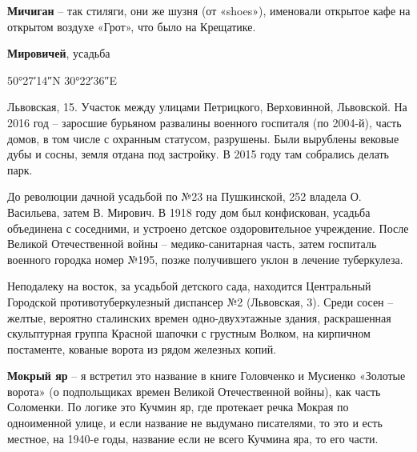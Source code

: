 

\textbf{Мичиган} – так стиляги, они же шузня (от «shoes»), именовали открытое кафе на открытом воздухе «Грот», что было на Крещатике.\\

\medskip

\textbf{Мировичей}, усадьба

50°27′14″N 30°22′36″E

Львовская, 15. Участок между улицами Петрицкого, Верховинной, Львовской. На 2016 год – заросшие бурьяном развалины военного госпиталя (по 2004-й), часть домов, в том числе с охранным статусом, разрушены. Были вырублены вековые дубы и сосны, земля отдана под застройку. В 2015 году там собрались делать парк.

До революции дачной усадьбой по №23 на Пушкинской, 252 владела О. Васильева, затем В. Мирович. В 1918 году дом был конфискован, усадьба объединена с соседними, и устроено детское оздоровительное учреждение. После Великой Отечественной войны – медико-санитарная часть, затем госпиталь военного городка номер №195, позже получившего уклон в лечение туберкулеза.

Неподалеку на восток, за усадьбой детского сада, находится Центральный Городской противотуберкулезный диспансер №2 (Львовская, 3). Среди сосен – желтые, вероятно сталинских времен одно-двухэтажные здания, раскрашенная скульптурная группа Красной шапочки с грустным Волком, на кирпичном постаменте, кованые ворота из рядом железных копий.\\

\medskip


\textbf{Мокрый яр} – я встретил это название в книге Головченко и Мусиенко «Золотые ворота» (о подпольщиках времен Великой Отечественной войны), как часть Соломенки. По логике это Кучмин яр, где протекает речка Мокрая по одноименной улице, и если название не выдумано писателями, то это и есть местное, на 1940-е годы, название если не всего Кучмина яра, то его части.\\

